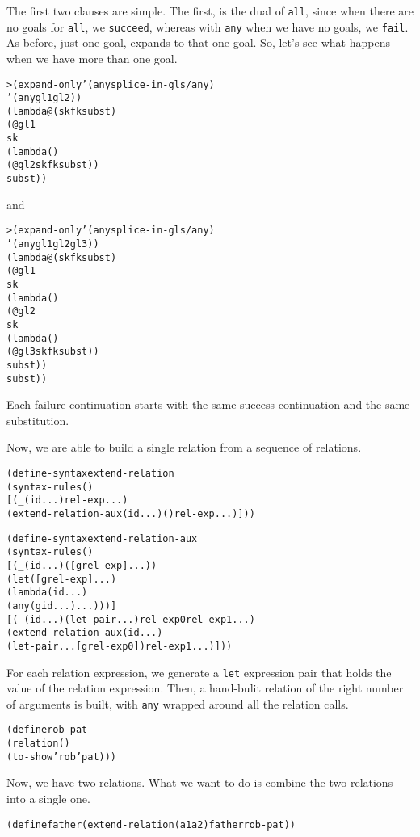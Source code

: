 The first two clauses are simple.  The first, is the dual of
\texttt{all}, since when there are no goals for \texttt{all},
we \texttt{succeed}, whereas with \texttt{any} when we have no
goals, we \texttt{fail}.  As before, just one goal, expands
to that one goal.  So, let's see what happens when we have more
than one goal.

\begin{alltt}
> (expand-only '(any splice-in-gls/any)
    '(any gl1 gl2))
(lambda@ (sk fk subst)
  (@ gl1
     sk
     (lambda ()
       (@ gl2 sk fk subst))
     subst))
\end{alltt}

\noindent
and

\begin{alltt}
> (expand-only '(any splice-in-gls/any)
    '(any gl1 gl2 gl3))
(lambda@ (sk fk subst)
  (@ gl1
     sk
     (lambda ()
       (@ gl2
          sk
          (lambda ()
            (@ gl3 sk fk subst))
          subst))
     subst))
\end{alltt}
\noindent
Each failure continuation starts with the same success continuation
and the same substitution.

Now, we are able to build a single relation from a sequence of relations.

\begin{alltt}
(define-syntax extend-relation
  (syntax-rules ()
    [(_ (id ...) rel-exp ...)
     (extend-relation-aux (id ...) () rel-exp ...)]))

(define-syntax extend-relation-aux
  (syntax-rules ()
    [(_ (id ...) ([g rel-exp] ...))
     (let ([g rel-exp] ...)
       (lambda (id ...)
         (any (g id ...) ...)))]
    [(_ (id ...) (let-pair ...) rel-exp0 rel-exp1 ...)
     (extend-relation-aux (id ...)
       (let-pair ... [g rel-exp0]) rel-exp1 ...)]))
\end{alltt}

For each relation expression, we generate a \texttt{let} expression
pair that holds the value of the relation expression.  Then, a
hand-bulit relation of the right number of arguments is built, with
\texttt{any} wrapped around all the relation calls.

\begin{alltt}
(define rob-pat
  (relation ()
    (to-show 'rob 'pat)))
\end{alltt}

Now, we have two relations.  What we want to do is combine the two
relations into a single one.

\begin{alltt}
(define father (extend-relation (a1 a2) father rob-pat))
\end{alltt}

